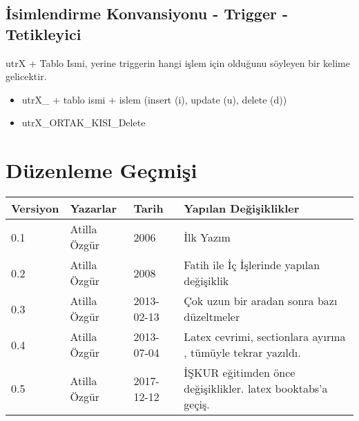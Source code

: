 \documentclass[10pt,a4paper,draft]{article}
\begin{document}
\subsection{İsimlendirme Konvansiyonu - Trigger - Tetikleyici  }  
utrX + Tablo Ismi, yerine triggerin hangi işlem için olduğunu söyleyen bir kelime gelicektir. 

\begin{itemize}
\item utrX\_ + tablo ismi + islem (insert (i), update (u), delete (d))
\item utrX\_ORTAK\_KISI\_Delete
\end{itemize}  

  
  
\section{Düzenleme Geçmişi} 

\begin{tabular}{@{}llll@{}}

\toprule

 Versiyon & Yazarlar & Tarih & Yapılan Değişiklikler  \\ 

\midrule

 0.1 &  Atilla Özgür & 2006 & İlk Yazım   \\ 
 0.2 &  Atilla Özgür & 2008 & Fatih ile İç İşlerinde yapılan değişiklik \\ 
 0.3 &  Atilla Özgür & 2013-02-13 & Çok uzun bir aradan sonra bazı düzeltmeler  \\ 
 0.4 &  Atilla Özgür & 2013-07-04 & Latex cevrimi, sectionlara ayırma , tümüyle tekrar yazıldı.  \\ 
 0.5 &  Atilla Özgür & 2017-12-12 & İŞKUR eğitimden önce değişiklikler. latex booktabs'a geçiş.   \\ 
\bottomrule
\end{tabular}
\end{document}
